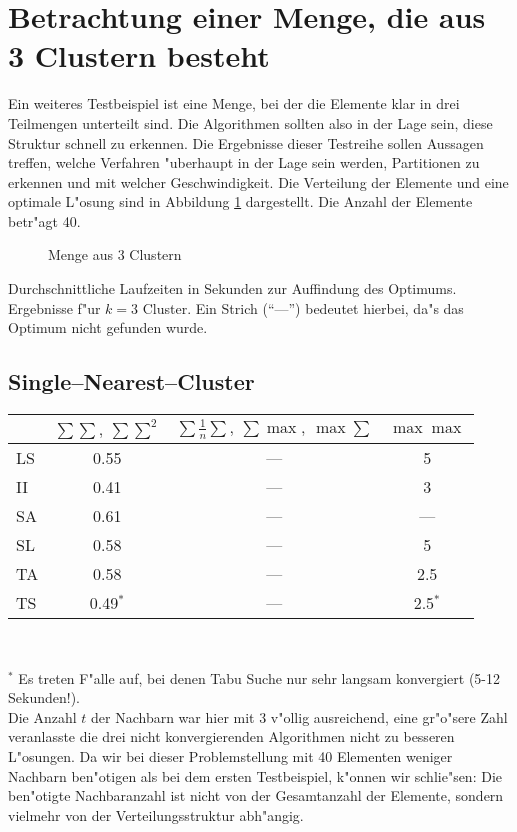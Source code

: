 \section{Betrachtung einer Menge, die aus 3 Clustern besteht}
\label{kap42}
Ein weiteres Testbeispiel ist eine Menge, bei der die Elemente klar
in drei Teilmengen unterteilt sind. Die Algorithmen sollten also in der Lage 
sein, diese Struktur schnell zu erkennen. Die Ergebnisse dieser Testreihe 
sollen Aussagen treffen, welche Verfahren "uberhaupt in der Lage sein werden,
Partitionen zu erkennen und mit welcher Geschwindigkeit.
Die Verteilung der Elemente und eine optimale L"osung sind in 
Abbildung \ref{3haufen} dargestellt. Die Anzahl der Elemente betr"agt 40.

\begin{figure}[htbp]
\caption{Menge aus 3 Clustern}
\label{3haufen}
\end{figure}

Durchschnittliche Laufzeiten in Sekunden zur Auf\/findung des Optimums. 
Ergebnisse f"ur $k=3$ Cluster. Ein Strich ("`---"') bedeutet hierbei, da"s
das Optimum nicht gefunden wurde.

\subsection*{Single--Nearest--Cluster}

\begin{center}
\begin{tabular}{l|c|c|c}
 & $\sum\sum,\ \sum\sum^2$ & $\sum \frac 1n \sum,\ \sum\max,\ \max\sum$ &
 	$\max\max$\\
	\hline
LS & 0.55     & --- & 5\\
II & 0.41     & --- & 3\\
SA & 0.61     & --- & ---\\
SL & 0.58     & --- & 5\\
TA & 0.58     & --- & 2.5\\
TS & 0.49$^*$ & --- & 2.5$^*$
\end{tabular}\\
\end{center}
$^*$ Es treten F"alle auf, bei denen Tabu Suche nur sehr
langsam konvergiert (5-12 Sekunden!).\\


Die Anzahl $t$ der Nachbarn war hier mit 3 v"ollig ausreichend, eine
gr"o"sere Zahl veranlasste die drei nicht konvergierenden Algorithmen
nicht zu besseren L"osungen. Da wir bei dieser Problemstellung  mit 40 
Elementen weniger Nachbarn ben"otigen als bei dem ersten Testbeispiel,
k"onnen wir schlie"sen: Die  ben"otigte Nachbaranzahl ist nicht von
der Gesamtanzahl der Elemente, sondern vielmehr von der 
Verteilungsstruktur abh"angig.

